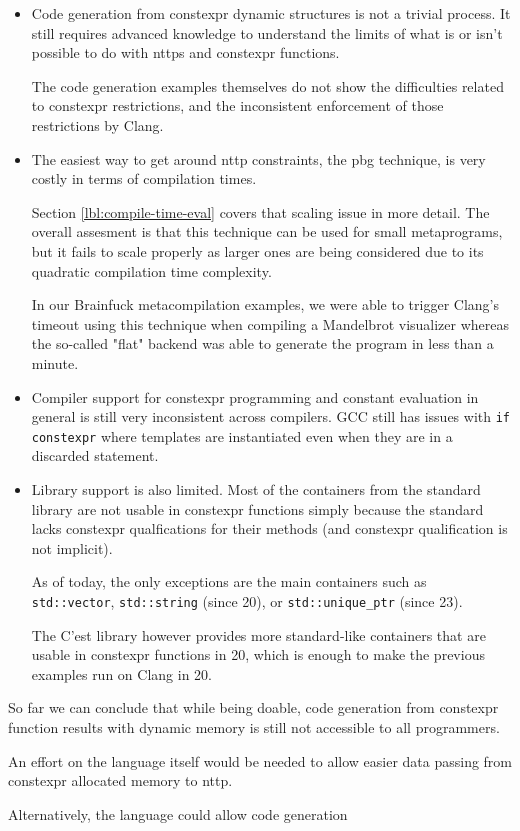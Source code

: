 \documentclass[../main]{subfiles}
\begin{document}
\begin{itemize}

\item
Code generation from \gls{constexpr} dynamic structures is not a trivial process.
It still requires advanced \cpp knowledge to understand the limits of what
is or isn't possible to do with \glspl{nttp} and \gls{constexpr} functions.

The code generation examples themselves do not show the difficulties related to
\cpp \gls{constexpr} restrictions, and the inconsistent enforcement
of those restrictions by Clang.

\item
The easiest way to get around \gls{nttp} constraints, \ie the \gls{pbg}
technique, is very costly in terms of compilation times.

Section \ref{lbl:compile-time-eval} covers that scaling issue in more detail.
The overall assesment is that this technique can be used for small metaprograms,
but it fails to scale properly as larger ones are being considered
due to its quadratic compilation time complexity.

In our Brainfuck metacompilation examples, we were able to trigger Clang's
timeout using this technique when compiling a Mandelbrot visualizer
whereas the so-called "flat" backend was able to generate the program in less
than a minute.

\item
Compiler support for \gls{constexpr} programming and constant evaluation in general
is still very inconsistent across compilers. GCC still has issues with
\lstinline{if constexpr} where templates are instantiated even when they are
in a discarded statement.

\item
Library support is also limited.
Most of the containers from the \cpp standard library are not usable in
\gls{constexpr} functions simply because the \cpp standard lacks \gls{constexpr}
qualfications for their methods (and \gls{constexpr} qualification is not implicit).

As of today, the only exceptions are the main containers such as
\lstinline{std::vector}, \lstinline{std::string} (since \cpp{}20),
or \lstinline{std::unique_ptr} (since \cpp{}23).

The C'est \cite{cest} library however provides more standard-like containers
that are usable in \gls{constexpr} functions in \cpp{}20, which is enough to make
the previous examples run on Clang in \cpp{}20.

\end{itemize}

So far we can conclude that while being doable, code generation from \gls{constexpr}
function results with dynamic memory is still not accessible to all \cpp
programmers.

An effort on the language itself would be needed to allow easier data passing
from \gls{constexpr} allocated memory to \gls{nttp}.

Alternatively, the language could allow code generation
\end{document}

